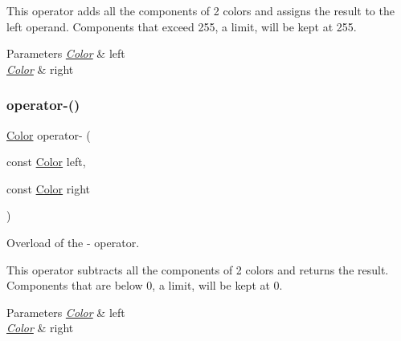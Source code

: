 This operator adds all the components of 2 colors and assigns the result to the left operand. Components that exceed 255, a limit, will be kept at 255.


\begin{DoxyParams}{Parameters}
{\em \hyperlink{classjetfuel_1_1draw_1_1Color}{Color}} & left \\
\hline
{\em \hyperlink{classjetfuel_1_1draw_1_1Color}{Color}} & right \\
\hline
\end{DoxyParams}
\mbox{\label{classjetfuel_1_1draw_1_1Color_aa6992ba7435232c7cd36cce08531f343}} 
\subsubsection{\texorpdfstring{operator-\/()}{operator-()}}
{\footnotesize\ttfamily \hyperlink{classjetfuel_1_1draw_1_1Color}{Color} operator-\/ (\begin{DoxyParamCaption}\item[{const \hyperlink{classjetfuel_1_1draw_1_1Color}{Color}}]{left,  }\item[{const \hyperlink{classjetfuel_1_1draw_1_1Color}{Color}}]{right }\end{DoxyParamCaption})\hspace{0.3cm}{\ttfamily [related]}}



Overload of the -\/ operator. 

This operator subtracts all the components of 2 colors and returns the result. Components that are below 0, a limit, will be kept at 0.


\begin{DoxyParams}{Parameters}
{\em \hyperlink{classjetfuel_1_1draw_1_1Color}{Color}} & left \\
\hline
{\em \hyperlink{classjetfuel_1_1draw_1_1Color}{Color}} & right \\
\hline
\end{DoxyParams}
\mbox{\label{classjetfuel_1_1draw_1_1Color_aad218c71ae58d4895e18fb6cd109d91f}} 
